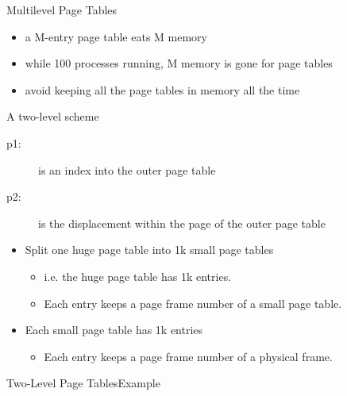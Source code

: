 \begin{frame}{Multilevel Page Tables}
  \begin{itemize}
  \item a \unit[1]{M}-entry page table eats \unit[4]{M} memory
  \item while 100 processes running, \unit[400]{M} memory is gone for page tables
  \item avoid keeping all the page tables in memory all the time
  \end{itemize}
  \begin{iblock}{A two-level scheme}
    \begin{center}
    \end{center}
  \end{iblock}
\end{frame}

\begin{description}
\item[p1:] is an index into the outer page table
\item[p2:] is the displacement within the page of the outer page table
\end{description}

\begin{itemize}
\item Split one huge page table into 1k small page tables
  \begin{itemize}
  \item i.e. the huge page table has 1k entries.
  \item Each entry keeps a page frame number of a small page table.
  \end{itemize}
\item Each small page table has 1k entries
  \begin{itemize}
  \item Each entry keeps a page frame number of a physical frame.
  \end{itemize}
\end{itemize}

\begin{frame}{Two-Level Page Tables}{Example}
  \centering
  \mode<beamer>{ \texttt{[image: 2-level-paging-2]} }%
\end{frame}

